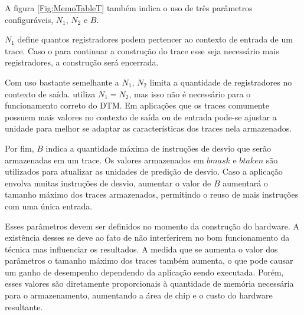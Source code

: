 A figura \ref{Fig:MemoTableT} também indica o uso de três parâmetros configuráveis, $N_{1}$, $N_{2}$ e $B$. 

$N_{1}$ define quantos registradores podem pertencer ao contexto de entrada de um trace. Caso o para continuar a construção do trace esse seja necessário mais registradores, a construção será encerrada. 

Com uso bastante semelhante a $N_{1}$, $N_{2}$ limita a quantidade de registradores no contexto de saída.  utiliza $N_{1} = N_{2}$, mas isso não é necessário para o funcionamento correto do DTM. Em aplicações que os traces comumente possuem mais valores no contexto de saída ou de entrada pode-se ajustar a unidade para melhor se adaptar as características dos traces nela armazenados. 

Por fim, $B$ indica a quantidade máxima de instruções de desvio que serão armazenadas em um trace. Os valores armazenados em $bmask$ e $btaken$ são utilizados para atualizar as unidades de predição de desvio. Caso a aplicação envolva muitas instruções de desvio, aumentar o valor de $B$ aumentará o tamanho máximo dos traces armazenados, permitindo o reuso de mais instruções com uma única entrada.

Esses parâmetros devem ser definidos no momento da construção do hardware. A existência desses se deve ao fato de não interferirem no bom funcionamento da técnica mas influenciar os resultados. A medida que se aumenta o valor dos parâmetros o tamanho máximo dos traces também aumenta, o que pode causar um ganho de desempenho dependendo da aplicação sendo executada. Porém, esses valores são diretamente proporcionais à quantidade de memória necessária para o armazenamento, aumentando a área de chip e o custo do hardware resultante.

